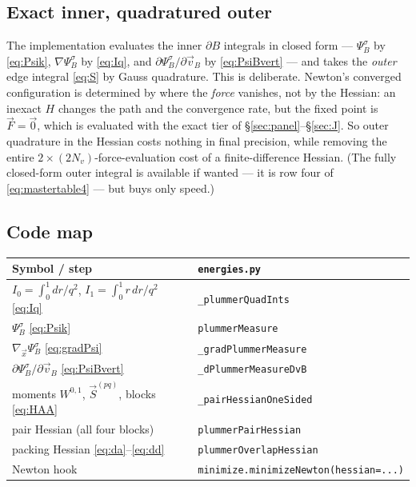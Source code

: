 \documentclass[11pt]{article}
\numberwithin{equation}{section}
\newcommand{\vv}[1]{\vec{#1}}
\begin{document}
\subsection{Exact inner, quadratured outer}
The implementation evaluates the inner $\partial B$ integrals in closed form --- $\Psi_B^\sigma$ by
\eqref{eq:Psik}, $\nabla\Psi_B^\sigma$ by \eqref{eq:Iq}, and $\partial\Psi_B^\sigma/\partial\vv v_B$ by
\eqref{eq:PsiBvert} --- and takes the \emph{outer} edge integral \eqref{eq:S} by Gauss quadrature. This
is deliberate. Newton's converged configuration is determined by where the \emph{force} vanishes, not by
the Hessian: an inexact $H$ changes the path and the convergence rate, but the fixed point is
$\vv F=\vv 0$, which is evaluated with the exact tier of \S\ref{sec:panel}--\S\ref{sec:J}. So outer
quadrature in the Hessian costs nothing in final precision, while removing the entire
$2\times(2N_v)$-force-evaluation cost of a finite-difference Hessian. (The fully closed-form outer
integral is available if wanted --- it is row four of \eqref{eq:mastertable4} --- but buys only speed.)

\subsection{Code map}
\begin{center}
\begin{tabular}{ll}
\hline
Symbol / step & \texttt{energies.py}\\
\hline
$I_0=\int_0^1dr/q^2$, $I_1=\int_0^1r\,dr/q^2$ \eqref{eq:Iq} & \texttt{\_plummerQuadInts}\\
$\Psi_B^\sigma$ \eqref{eq:Psik} & \texttt{plummerMeasure}\\
$\nabla_{\!\vv x}\Psi_B^\sigma$ \eqref{eq:gradPsi} & \texttt{\_gradPlummerMeasure}\\
$\partial\Psi_B^\sigma/\partial\vv v_B$ \eqref{eq:PsiBvert} & \texttt{\_dPlummerMeasureDvB}\\
moments $W^{0,1}$, $\vv S^{(pq)}$, blocks \eqref{eq:HAA} & \texttt{\_pairHessianOneSided}\\
pair Hessian (all four blocks) & \texttt{plummerPairHessian}\\
packing Hessian \eqref{eq:da}--\eqref{eq:dd} & \texttt{plummerOverlapHessian}\\
Newton hook & \texttt{minimize.minimizeNewton(hessian=...)}\\
\hline
\end{tabular}
\end{center}
\end{document}
